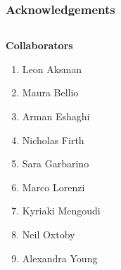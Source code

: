\begin{frame}[label=current]
\frametitle{Acknowledgements}

 
 \begin{small}
\begin{columns}[T]
    \begin{column}{.3\textwidth}
    \textbf{Collaborators}
    \begin{enumerate}
    \item Leon Aksman
    \item Maura Bellio
     \item Arman Eshaghi
     \item Nicholas Firth
     \item Sara Garbarino
     \item Marco Lorenzi
     \item Kyriaki Mengoudi
     \item Neil Oxtoby
     \item Alexandra Young
    \end{enumerate}
    \end{column}
    
    
%       
%      
%       
% 
%     
\end{columns}
 
\end{small}


\end{frame}

